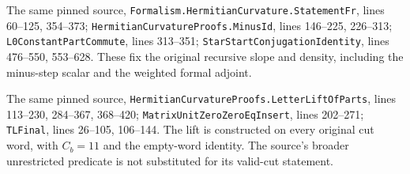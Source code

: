 The same pinned source,
\texttt{Formalism.HermitianCurvature.StatementFr}, lines 60--125,
354--373;
\texttt{HermitianCurvatureProofs.MinusId}, lines 146--225, 226--313;
\texttt{L0ConstantPartCommute}, lines 313--351;
\texttt{StarStartConjugationIdentity}, lines 476--550, 553--628.
These fix the original recursive slope and density, including
the minus-step scalar and the weighted formal adjoint.

The same pinned source,
\texttt{HermitianCurvatureProofs.LetterLiftOfParts},
lines 113--230, 284--367, 368--420;
\texttt{MatrixUnitZeroZeroEqInsert}, lines 202--271;
\texttt{TLFinal}, lines 26--105, 106--144.
The lift is constructed on every original cut word, with
$C_b=11$ and the empty-word identity.  The source's broader
unrestricted predicate is not substituted for its valid-cut
statement.

